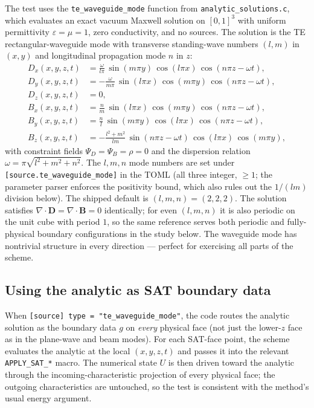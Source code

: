 \documentclass[11pt]{article}
\newcommand{\vB}{\mathbf{B}}
\newcommand{\vD}{\mathbf{D}}
\begin{document}
The test uses the \texttt{te\_waveguide\_mode} function from
\texttt{analytic\_solutions.c}, which evaluates an exact vacuum
Maxwell solution on $[0, 1]^3$ with uniform permittivity
$\varepsilon = \mu = 1$, zero conductivity, and no sources. The
solution is the TE rectangular-waveguide mode with transverse
standing-wave numbers $(l, m)$ in $(x, y)$ and longitudinal
propagation mode $n$ in $z$:
\begin{align*}
  D_x(x, y, z, t) &= \frac{\omega}{l \pi}\, \sin(m \pi y)\, \cos(l \pi x)\,
                     \cos(n \pi z - \omega t), \\
  D_y(x, y, z, t) &= -\frac{\omega}{m \pi}\, \sin(l \pi x)\, \cos(m \pi y)\,
                     \cos(n \pi z - \omega t), \\
  D_z(x, y, z, t) &= 0, \\
  B_x(x, y, z, t) &= \frac{n}{m}\, \sin(l \pi x)\, \cos(m \pi y)\,
                     \cos(n \pi z - \omega t), \\
  B_y(x, y, z, t) &= \frac{n}{l}\, \sin(m \pi y)\, \cos(l \pi x)\,
                     \cos(n \pi z - \omega t), \\
  B_z(x, y, z, t) &= -\frac{l^2 + m^2}{l m}\, \sin(n \pi z - \omega t)\,
                     \cos(l \pi x)\, \cos(m \pi y),
\end{align*}
with constraint fields $\Psi_D = \Psi_B = \rho = 0$ and the
dispersion relation $\omega = \pi \sqrt{l^2 + m^2 + n^2}$. The
$l, m, n$ mode numbers are set under \texttt{[source.te\_waveguide\_mode]}
in the TOML (all three integer, $\geq 1$; the parameter parser
enforces the positivity bound, which also rules out the $1/(lm)$
division below). The shipped default is $(l, m, n) = (2, 2, 2)$.
The solution satisfies $\nabla \cdot \vD = \nabla \cdot \vB = 0$
identically; for even $(l, m, n)$ it is also periodic on the unit
cube with period $1$, so the same reference serves both periodic
and fully-physical boundary configurations in the study below.
The waveguide mode has nontrivial structure in every direction —
perfect for exercising all parts of the scheme.

\subsection{Using the analytic as SAT boundary data}

When \texttt{[source] type = "te\_waveguide\_mode"}, the code routes the
analytic solution as the boundary data $g$ on \emph{every} physical
face (not just the lower-$z$ face as in the plane-wave and beam
modes). For each SAT-face point, the scheme evaluates the analytic
at the local $(x, y, z, t)$ and passes it into the relevant
\texttt{APPLY\_SAT\_*} macro. The numerical state $U$ is then driven
toward the analytic through the incoming-characteristic projection
of every physical face; the outgoing characteristics are untouched,
so the test is consistent with the method's usual energy argument.
\end{document}
